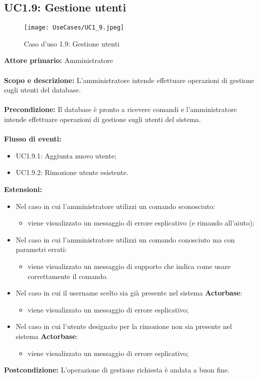 \documentclass{scalatekids-article}
\begin{document}
\subsection{UC1.9: Gestione utenti}
\begin{figure}[H]
  \begin{center}
    \texttt{[image: UseCases/UC1\_9.jpeg]}
    \caption{Caso d'uso 1.9: Gestione utenti}
  \end{center}
\end{figure}
\textbf{Attore primario:} Amministratore\\ \\
\textbf{Scopo e descrizione:} L'amministratore intende effettuare operazioni di gestione sugli utenti del database.\\ \\
\textbf{Precondizione:} Il database è pronto a ricevere comandi e l'amministratore intende effettuare operazioni di gestione sugli utenti del sistema.\\ \\
\textbf{Flusso di eventi:}
\begin{itemize}
\item UC1.9.1: Aggiunta nuovo utente;
\item UC1.9.2: Rimozione utente esistente.
\end{itemize}
\textbf{Estensioni:}
\begin{itemize}
\item Nel caso in cui l'amministratore utilizzi un comando sconosciuto:
  \begin{itemize}
  \item viene visualizzato un messaggio di errore esplicativo (e rimando all'aiuto);
  \end{itemize}
\item Nel caso in cui l'amministratore utilizzi un comando conosciuto ma con parametri errati:
  \begin{itemize}
  \item viene visualizzato un messaggio di supporto che indica come usare correttamente il comando.
  \end{itemize}
\item Nel caso in cui il username scelto sia già presente nel sistema \textbf{Actorbase}:
  \begin{itemize}
  \item viene visualizzato un messaggio di errore esplicativo;
  \end{itemize}
\item Nel caso in cui l'utente designato per la rimozione non sia presente nel sistema \textbf{Actorbase}:
  \begin{itemize}
  \item viene visualizzato un messaggio di errore esplicativo;
  \end{itemize}
\end{itemize}
\textbf{Postcondizione:} L'operazione di gestione richiesta è andata a buon fine.
\end{document}
